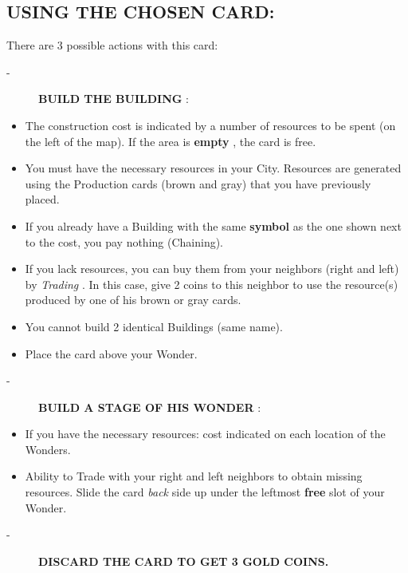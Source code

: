 \documentclass{scrartcl}%
\begin{document}
\subsection{ USING THE CHOSEN CARD:
}%
\label{subsec:USINGTHECHOSENCARD}%
There are 3 possible actions with this card:
%
\begin{description}%
\item[{-} ]%
%
\textbf{BUILD THE BUILDING}%
:
%
\end{description}%
\begin{itemize}%
\item%
%
 The construction cost is indicated by a number of resources to be spent (on the left of the map). If the area is %
\textbf{empty}%
, the card is free.
%
\item%
%
 You must have the necessary resources in your City. Resources are generated using the Production cards (brown and gray) that you have previously placed.
%
\item%
%
 If you already have a Building with the same %
\textbf{symbol}%
\textit{ }%
 as the one shown next to the cost, you pay nothing (Chaining).
%
\item%
%
 If you lack resources, you can buy them from your neighbors (right and left) by %
\textit{Trading}%
. In this case, give 2 coins to this neighbor to use the resource(s) produced by one of his brown or gray cards.
%
\item%
%
 You cannot build 2 identical Buildings (same name).
%
\item%
%
 Place the card above your Wonder.
%
\end{itemize}%
\begin{description}%
\item[{-} ]%
%
\textbf{BUILD A STAGE OF HIS WONDER}%
:
%
\end{description}%
\begin{itemize}%
\item%
%
 If you have the necessary resources: cost indicated on each location of the Wonders.
%
\item%
%
 Ability to Trade with your right and left neighbors to obtain missing resources. Slide the card %
\textit{back}%
\textit{ }%
 side up under the leftmost %
\textbf{free}%
\textit{ }%
 slot of your Wonder.
%
\end{itemize}%
\begin{description}%
\item[{-} ]%
%
\textbf{DISCARD THE CARD TO GET 3 GOLD COINS.}%

%
\end{description}
\end{document}
